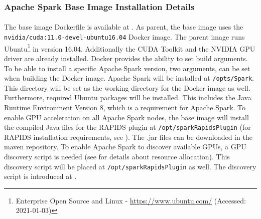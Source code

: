 \subsubsection{Apache Spark Base Image Installation Details}
\paragraph{}The base image Dockerfile is available at .
As parent, the base image uses the \texttt{nvidia/cuda:11.0-devel-ubuntu16.04} Docker image. The parent image runs Ubuntu\footnote{Enterprise Open Source and Linux - \url{https://www.ubuntu.com/} (Accessed: 2021-01-03)} in version 16.04. Additionally the CUDA Toolkit and the NVIDIA GPU driver are already installed.
Docker provides the ability to set build arguments. To be able to install a specific Apache Spark version, two arguments,  can be set when building the Docker image.
Apache Spark will be installed at \texttt{/opts/Spark}.
This directory will be set as the working directory for the Docker image as well.
Furthermore, required Ubuntu packages will be installed. This includes the Java Runtime Environment Version 8, which is a requirement for Apache Spark.
To enable GPU acceleration on all Apache Spark nodes, the base image will install the compiled Java files for the RAPIDS plugin at \texttt{/opt/sparkRapidsPlugin} (for RAPIDS installation requirements, see ). The .jar files can be downloaded in the maven repository.
To enable Apache Spark to discover available GPUs, a GPU discovery script is needed (see  for details about resource allocation). This discovery script will be placed at \texttt{/opt/sparkRapidsPlugin} as well. The discovery script is introduced at .






